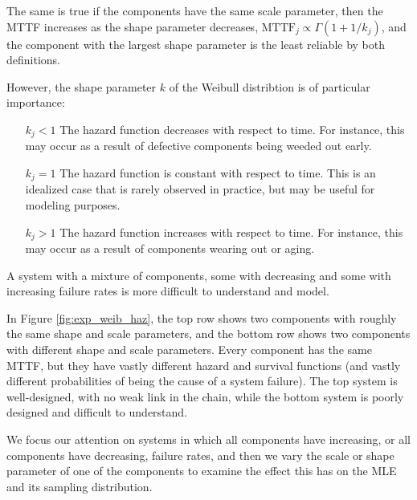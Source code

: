 \documentclass[
]{article}
\begin{document}
The same is true if the components have the same scale parameter, then
the MTTF increases as the shape parameter decreases,
\(\text{MTTF}_j \propto \Gamma(1 + 1/k_j)\), and the component with the
largest shape parameter is the least reliable by both definitions.

However, the shape parameter \(k\) of the Weibull distribtion is of
particular importance:

\begin{enumerate}
\item[$k_j < 1$] The hazard function decreases with respect to time. For instance,
  this may occur as a result of defective components being weeded out early.
\item[$k_j = 1$] The hazard function is constant with respect to time. This is an
  idealized case that is rarely observed in practice, but may be useful for modeling
  purposes.
\item[$k_j > 1$] The hazard function increases with respect to time. For instance,
  this may occur as a result of components wearing out or aging.
\end{enumerate}

A system with a mixture of components, some with decreasing and some
with increasing failure rates is more difficult to understand and model.

In Figure \ref{fig:exp_weib_haz}, the top row shows two components with
roughly the same shape and scale parameters, and the bottom row shows
two components with different shape and scale parameters. Every
component has the same MTTF, but they have vastly different hazard and
survival functions (and vastly different probabilities of being the
cause of a system failure). The top system is well-designed, with no
weak link in the chain, while the bottom system is poorly designed and
difficult to understand.

We focus our attention on systems in which all components have
increasing, or all components have decreasing, failure rates, and then
we vary the scale or shape parameter of one of the components to examine
the effect this has on the MLE and its sampling distribution.
\end{document}
